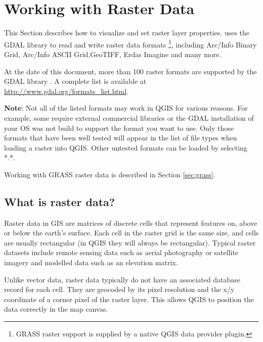 
\chapter{Working with Raster Data}\label{label_raster}

\updatedisclaimer

This Section describes how to visualize and set raster layer properties.
\qg uses the GDAL library to read and write raster data formats
\footnote{GRASS raster support is supplied by a native QGIS data provider 
plugin.}, including Arc/Info Binary Grid, 
Arc/Info ASCII Grid,GeoTIFF,
Erdas Imagine and many more. 

At the date of this document, more than 100 raster formats are supported 
by the GDAL library \cite{GDALweb}. A complete list is available at 
\url{http://www.gdal.org/formats_list.html}.

\textbf{Note}: Not all of the listed formats may work in QGIS for various 
reasons. For example, some require external commercial libraries or 
the GDAL installation of your OS was not build to support the format you want
to use. Only those formats that have been well tested will appear in the list
of file types when loading a raster into QGIS. Other untested formats can 
be loaded by selecting *.*.

Working with GRASS raster data is described in Section \ref{sec:grass}.

\section{What is raster data?}\label{label_whatsraster}

Raster data in GIS are matrices of discrete cells that represent features on,
above or below the earth's surface. Each cell in the raster grid is the same
size, and cells are usually rectangular (in QGIS they will always be
rectangular). Typical raster datasets include remote sensing data such as
aerial photography or satellite imagery and modelled data such as an elevation
matrix.

Unlike vector data, raster data typically do not have an associated database
record for each cell. They are geocoded by its pixel resolution and the x/y
coordinate of a corner pixel of the raster layer. This allows QGIS to position
the data correctly in the map canvas.

